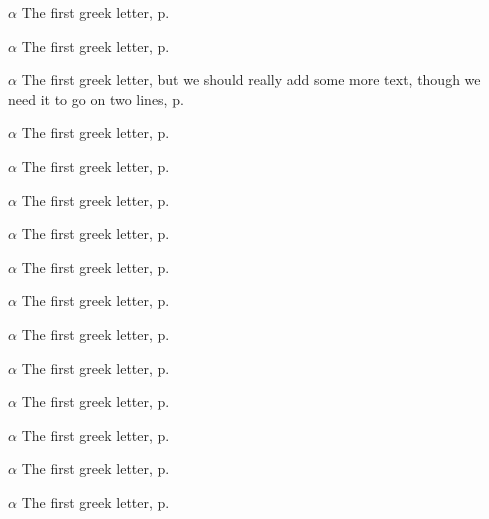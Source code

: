 \begin{eqlist}

\item[$\alpha$]
The first greek letter, p.~\pageref{ChX-figure: FigureLabel3}

\item[$\alpha$]
The first greek letter, p.~\pageref{ChX-figure: FigureLabel3}

\item[$\alpha$]
The first greek letter, but we should really add some more text, though we need it to go on two lines, p.~\pageref{ChX-figure: FigureLabel7}

\item[$\alpha$]
The first greek letter, p.~\pageref{ChX-figure: FigureLabel3}

\item[$\alpha$]
The first greek letter, p.~\pageref{ChX-figure: FigureLabel4}

\item[$\alpha$]
The first greek letter, p.~\pageref{ChX-figure: FigureLabel5}

\item[$\alpha$]
The first greek letter, p.~\pageref{ChX-figure: FigureLabel6}

\item[$\alpha$]
The first greek letter, p.~\pageref{ChX-figure: FigureLabel7}

\item[$\alpha$]
The first greek letter, p.~\pageref{ChX-figure: FigureLabel8}

\item[$\alpha$]
The first greek letter, p.~\pageref{ChX-figure: FigureLabel9}

\item[$\alpha$]
The first greek letter, p.~\pageref{ChX-figure: FigureLabel10}

\item[$\alpha$]
The first greek letter, p.~\pageref{ChX-figure: FigureLabel3}

\item[$\alpha$]
The first greek letter, p.~\pageref{ChX-figure: FigureLabel4}

\item[$\alpha$]
The first greek letter, p.~\pageref{ChX-figure: FigureLabel5}

\item[$\alpha$]
The first greek letter, p.~\pageref{ChX-figure: FigureLabel6}


\end{eqlist}
